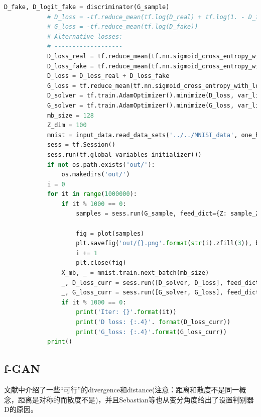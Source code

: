 \begin{lstlisting}[language = Python]
            D_fake, D_logit_fake = discriminator(G_sample)
            # D_loss = -tf.reduce_mean(tf.log(D_real) + tf.log(1. - D_fake))
            # G_loss = -tf.reduce_mean(tf.log(D_fake))
            # Alternative losses:
            # -------------------
            D_loss_real = tf.reduce_mean(tf.nn.sigmoid_cross_entropy_with_logits(logits=D_logit_real, labels=tf.ones_like(D_logit_real)))
            D_loss_fake = tf.reduce_mean(tf.nn.sigmoid_cross_entropy_with_logits(logits=D_logit_fake, labels=tf.zeros_like(D_logit_fake)))
            D_loss = D_loss_real + D_loss_fake
            G_loss = tf.reduce_mean(tf.nn.sigmoid_cross_entropy_with_logits(logits=D_logit_fake, labels=tf.ones_like(D_logit_fake)))
            D_solver = tf.train.AdamOptimizer().minimize(D_loss, var_list=theta_D)
            G_solver = tf.train.AdamOptimizer().minimize(G_loss, var_list=theta_G)
            mb_size = 128
            Z_dim = 100
            mnist = input_data.read_data_sets('../../MNIST_data', one_hot=True)
            sess = tf.Session()
            sess.run(tf.global_variables_initializer())
            if not os.path.exists('out/'):
                os.makedirs('out/')
            i = 0
            for it in range(1000000):
                if it % 1000 == 0:
                    samples = sess.run(G_sample, feed_dict={Z: sample_Z(16, Z_dim)})

                    fig = plot(samples)
                    plt.savefig('out/{}.png'.format(str(i).zfill(3)), bbox_inches='tight')
                    i += 1
                    plt.close(fig)
                X_mb, _ = mnist.train.next_batch(mb_size)
                _, D_loss_curr = sess.run([D_solver, D_loss], feed_dict={X: X_mb, Z: sample_Z(mb_size, Z_dim)})
                _, G_loss_curr = sess.run([G_solver, G_loss], feed_dict={Z: sample_Z(mb_size, Z_dim)})
                if it % 1000 == 0:
                    print('Iter: {}'.format(it))
                    print('D loss: {:.4}'. format(D_loss_curr))
                    print('G_loss: {:.4}'.format(G_loss_curr))
            print()
            \end{lstlisting}

    \subsection{f-GAN}
        \par
        文献\cite{2016.Sebastian}中介绍了一些“可行”的divergence和distance(注意：距离和散度不是同一概念，距离是对称的而散度不是)，并且Sebastian等也从变分角度给出了设置判别器D的原因。
